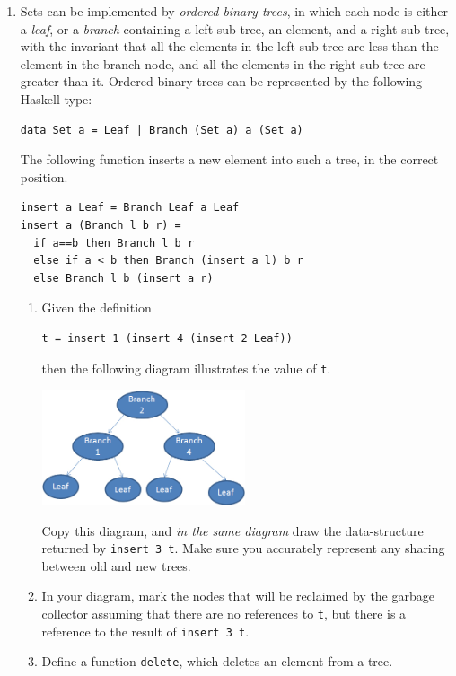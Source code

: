 \documentclass{article}
\begin{document}
\begin{enumerate}
\begin{enumerate}
\end{enumerate}

\item
Sets can be implemented by {\em ordered binary trees}, in which each
node is either a {\em leaf}, or a {\em branch} containing a left
sub-tree, an element, and a right sub-tree, with the invariant that
all the elements in the left sub-tree are less than the element in the
branch node, and all the elements in the right sub-tree are greater
than it. Ordered binary trees can be represented by the following
Haskell type:
\begin{verbatim}
data Set a = Leaf | Branch (Set a) a (Set a)
\end{verbatim}
The following function inserts a new element into such a
tree, in the correct position.
\begin{verbatim}
insert a Leaf = Branch Leaf a Leaf
insert a (Branch l b r) =
  if a==b then Branch l b r
  else if a < b then Branch (insert a l) b r
  else Branch l b (insert a r)
\end{verbatim}
\begin{enumerate}
\item
Given the definition
\begin{verbatim}
t = insert 1 (insert 4 (insert 2 Leaf))
\end{verbatim}
then the following diagram illustrates the value of
\verb!t!.

\includegraphics[width=6cm]{tree.jpg} 

Copy this diagram, and {\em in the same diagram} draw the data-structure
returned by \verb!insert 3 t!. Make sure you accurately represent any
sharing between old and new trees.


\item
In your diagram, mark the nodes that will be reclaimed by the garbage
collector assuming that there are no references to \verb!t!, but there
is a reference to the result of \verb!insert 3 t!.


\item
Define a function \verb!delete!, which deletes an element from a tree.



\end{enumerate}
\end{enumerate}
\end{document}
